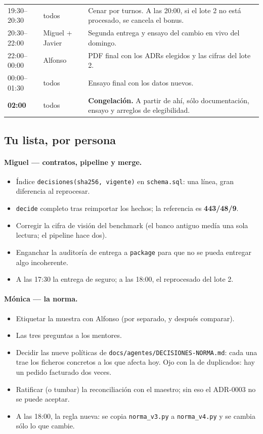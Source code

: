\documentclass[11pt,a4paper]{article}
\newcommand{\cmd}[1]{\texttt{\small #1}}
\begin{document}
\begin{center}
\begin{tabularx}{\linewidth}{llX}
19:30--20:30 & todos & Cenar por turnos. A las 20:00, si el lote 2 no está procesado, se cancela el bonus. \\
20:30--22:00 & Miguel + Javier & Segunda entrega y ensayo del cambio en vivo del domingo. \\
22:00--00:00 & Alfonso & PDF final con los ADRs elegidos y las cifras del lote 2. \\
00:00--01:30 & todos & Ensayo final con los datos nuevos. \\
\textbf{02:00} & todos & \textbf{Congelación.} A partir de ahí, sólo documentación, ensayo y arreglos de elegibilidad. \\
\bottomrule
\end{tabularx}
\end{center}

\subsection{Tu lista, por persona}

\paragraph{Miguel — contratos, pipeline y merge.}
\begin{itemize}
  \item Índice \cmd{decisiones(sha256, vigente)} en \cmd{schema.sql}: una línea, gran diferencia al reprocesar.
  \item \cmd{decide} completo tras reimportar los hechos; la referencia es \textbf{443/48/9}.
  \item Corregir la cifra de visión del benchmark (el banco antiguo medía una sola lectura; el pipeline hace dos).
  \item Enganchar la auditoría de entrega a \cmd{package} para que no se pueda entregar algo incoherente.
  \item A las 17:30 la entrega de seguro; a las 18:00, el reprocesado del lote 2.
\end{itemize}

\paragraph{Mónica — la norma.}
\begin{itemize}
  \item Etiquetar la muestra con Alfonso (por separado, y después comparar).
  \item Las tres preguntas a los mentores.
  \item Decidir las nueve políticas de \cmd{docs/agentes/DECISIONES-NORMA.md}: cada una trae los ficheros
        concretos a los que afecta hoy. Ojo con la de duplicados: hay un pedido facturado dos veces.
  \item Ratificar (o tumbar) la reconciliación con el maestro; sin eso el ADR-0003 no se puede aceptar.
  \item A las 18:00, la regla nueva: se copia \cmd{norma\_v3.py} a \cmd{norma\_v4.py} y se cambia sólo lo que cambie.
\end{itemize}
\end{document}
